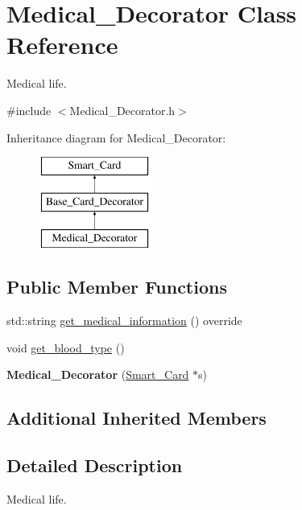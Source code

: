 \hypertarget{classMedical__Decorator}{}\section{Medical\+\_\+\+Decorator Class Reference}
\label{classMedical__Decorator}


Medical life.  




{\ttfamily \#include $<$Medical\+\_\+\+Decorator.\+h$>$}

Inheritance diagram for Medical\+\_\+\+Decorator\+:\begin{figure}[H]
\begin{center}
\leavevmode
\includegraphics[height=3.000000cm]{classMedical__Decorator}
\end{center}
\end{figure}
\subsection*{Public Member Functions}
\begin{DoxyCompactItemize}
\item 
std\+::string \mbox{\hyperlink{classMedical__Decorator_afde55c4f0f98d5ea566b5a989e631878}{get\+\_\+medical\+\_\+information}} () override
\item 
void \mbox{\hyperlink{classMedical__Decorator_a795110d53121358fcb3d34a187379350}{get\+\_\+blood\+\_\+type}} ()
\item 
\mbox{\label{classMedical__Decorator_a57ffdcc3faaca5f05b91aff7b6534d78}} 
{\bfseries Medical\+\_\+\+Decorator} (\mbox{\hyperlink{classSmart__Card}{Smart\+\_\+\+Card}} $\ast$s)
\end{DoxyCompactItemize}
\subsection*{Additional Inherited Members}


\subsection{Detailed Description}
Medical life. 

